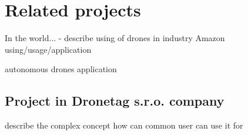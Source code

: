 \chapter{Related projects}\label{ch:related-projects}

In the world... - describe using of drones in industry
Amazon using/usage/application

autonomous drones application

\section{Project in Dronetag s.r.o. company}\label{sec:project-in-dronetag-s.r.o.-company}
describe the complex concept how can common user can use it for
